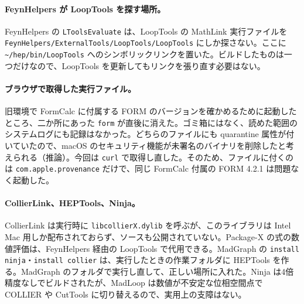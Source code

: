 \documentclass[a4paper,10pt]{ltjsarticle}
\newcommand{\pth}[1]{\texttt{\textasciitilde/}\nolinkurl{#1}}
\begin{document}
\paragraph{FeynHelpers が LoopTools を探す場所。}FeynHelpers の \texttt{LToolsEvaluate} は、LoopTools の MathLink 実行ファイルを \nolinkurl{FeynHelpers/ExternalTools/LoopTools/LoopTools} にしか探さない。ここに \pth{hep/bin/LoopTools} へのシンボリックリンクを置いた。ビルドしたものは一つだけなので、LoopTools を更新してもリンクを張り直す必要はない。

\paragraph{ブラウザで取得した実行ファイル。}旧環境で FormCalc に付属する FORM のバージョンを確かめるために起動したところ、二か所にあった \texttt{form} が直後に消えた。ゴミ箱にはなく、読めた範囲のシステムログにも記録はなかった。どちらのファイルにも quarantine 属性が付いていたので、macOS のセキュリティ機能が未署名のバイナリを削除したと考えられる（推論）。今回は \texttt{curl} で取得し直した。そのため、ファイルに付くのは \texttt{com.apple.provenance} だけで、同じ FormCalc 付属の FORM 4.2.1 は問題なく起動した。

\paragraph{CollierLink、HEPTools、Ninja。}CollierLink は実行時に \texttt{libcollierX.dylib} を呼ぶが、このライブラリは Intel Mac 用しか配布されておらず、ソースも公開されていない。Package-X の式の数値評価は、FeynHelpers 経由の LoopTools で代用できる。MadGraph の \texttt{install ninja}・\texttt{install collier} は、実行したときの作業フォルダに HEPTools を作る。MadGraph のフォルダで実行し直して、正しい場所に入れた。Ninja は4倍精度なしでビルドされたが、MadLoop は数値が不安定な位相空間点で COLLIER や CutTools に切り替えるので、実用上の支障はない。
\end{document}
